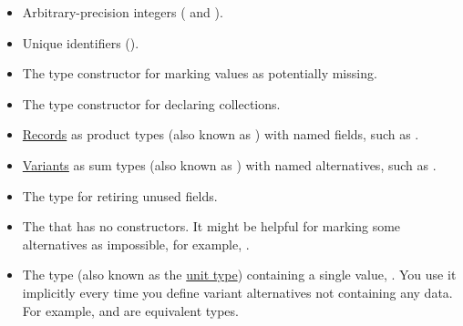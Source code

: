 \documentclass{article}
\begin{document}
\begin{itemize}
    \item
    Arbitrary-precision integers (\href{https://internetcomputer.org/docs/current/references/candid-ref#type-nat}{} and \href{https://internetcomputer.org/docs/current/references/candid-ref#type-int}{}).
    \item
    Unique identifiers (\href{https://internetcomputer.org/docs/current/references/candid-ref#type-principal}{}).
    \item
    The \href{https://internetcomputer.org/docs/current/references/candid-ref#type-opt-t}{} type constructor for marking values as potentially missing.
    \item
    The \href{https://internetcomputer.org/docs/current/references/candid-ref#type-vec-t}{} type constructor for declaring collections.
    \item
    \href{https://internetcomputer.org/docs/current/references/candid-ref#type-record--n--t--}{Records} as product types (also known as ) with named fields, such as \newline
    .
    \item
    \href{https://internetcomputer.org/docs/current/references/candid-ref#type-variant--n--t--}{Variants} as sum types (also known as ) with named alternatives, such as \newline
    .
    \item
    The \href{https://internetcomputer.org/docs/current/references/candid-ref#type-reserved}{} type for retiring unused fields.
    \item
    The \href{https://internetcomputer.org/docs/current/references/candid-ref#type-empty}{} that has no constructors.
    It might be helpful for marking some alternatives as impossible, for example, .
    \item
    The \href{https://internetcomputer.org/docs/current/references/candid-ref#type-null}{} type (also known as the \href{https://en.wikipedia.org/wiki/Unit_type}{unit type}) containing a single value, .
    You use it implicitly every time you define variant alternatives not containing any data.
    For example,  and  are equivalent types.

\end{itemize}
\end{document}
